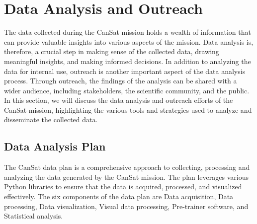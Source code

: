 \documentclass[11pt]{article}
\begin{document}
\section{Data Analysis and Outreach}
The data collected during the CanSat mission holds a wealth of information that can provide valuable insights into various aspects of the mission. Data analysis is, therefore, a crucial step in making sense of the collected data, drawing meaningful insights, and making informed decisions. In addition to analyzing the data for internal use, outreach is another important aspect of the data analysis process. Through outreach, the findings of the analysis can be shared with a wider audience, including stakeholders, the scientific community, and the public. In this section, we will discuss the data analysis and outreach efforts of the CanSat mission, highlighting the various tools and strategies used to analyze and disseminate the collected data.

\subsection{Data Analysis Plan}

The CanSat data plan is a comprehensive approach to collecting, processing and analyzing the data generated by the CanSat mission. The plan leverages various Python libraries to ensure that the data is acquired, processed, and visualized effectively. The six components of the data plan are Data acquisition, Data processing, Data visualization, Visual data processing, Pre-trainer software, and Statistical analysis.
\end{document}
